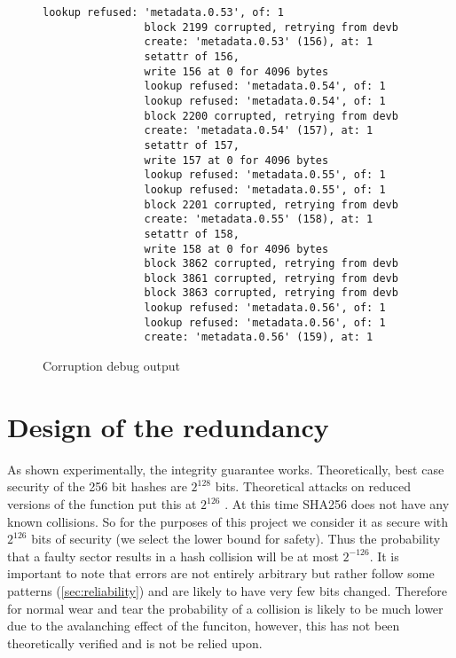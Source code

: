         \begin{figure}[h]
            \caption{Corruption debug output}
            \label{fig:corruption}
            \begin{lstlisting}[gobble=16]
                lookup refused: 'metadata.0.53', of: 1
                block 2199 corrupted, retrying from devb
                create: 'metadata.0.53' (156), at: 1
                setattr of 156,
                write 156 at 0 for 4096 bytes
                lookup refused: 'metadata.0.54', of: 1
                lookup refused: 'metadata.0.54', of: 1
                block 2200 corrupted, retrying from devb
                create: 'metadata.0.54' (157), at: 1
                setattr of 157,
                write 157 at 0 for 4096 bytes
                lookup refused: 'metadata.0.55', of: 1
                lookup refused: 'metadata.0.55', of: 1
                block 2201 corrupted, retrying from devb
                create: 'metadata.0.55' (158), at: 1
                setattr of 158,
                write 158 at 0 for 4096 bytes
                block 3862 corrupted, retrying from devb
                block 3861 corrupted, retrying from devb
                block 3863 corrupted, retrying from devb
                lookup refused: 'metadata.0.56', of: 1
                lookup refused: 'metadata.0.56', of: 1
                create: 'metadata.0.56' (159), at: 1
            \end{lstlisting}
        \end{figure}

    \section{Design of the redundancy}

        As shown experimentally, the integrity guarantee works. Theoretically,
        best case security of the 256 bit hashes are $2^{128}$ bits.
        Theoretical attacks on reduced versions of the function put this at
        $2^{126}$ \cite{sha2_security, sha2_analysis}. At this time
        SHA256 does not have any known collisions. So for the purposes of this
        project we consider it as secure with $2^{126}$ bits of security (we
        select the lower bound for safety). Thus the probability that a faulty
        sector results in a hash collision will be at most $2^{-126}$. It is
        important to note that errors are not entirely arbitrary but rather
        follow some patterns (\autoref{sec:reliability}) and are likely to have
        very few bits changed. Therefore for normal wear and tear the
        probability of a collision is likely to be much lower due to the
        avalanching effect of the funciton, however, this has not been
        theoretically verified and is not be relied upon.

